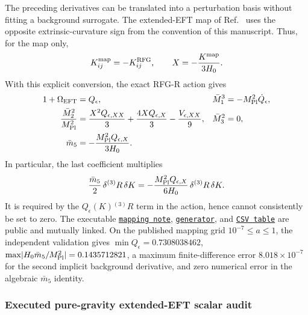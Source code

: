 \documentclass[11pt,a4paper]{article}
\newcommand{\RFGRepoURL}{https://github.com/MartinPetrasek123/MartinPetrasek123}
\newcommand{\RFGRepoNamed}[2]{\href{\RFGRepoURL/blob/main/r-universe-complete-chain/rfg-r-completion/r\_universe\_completion/#1}{\texttt{#2}}}
\begin{document}
The preceding derivatives can be translated into a perturbation basis without
fitting a background surrogate.  The extended-EFT map of
Ref.~\cite{ExtendedEFTMap} uses the opposite extrinsic-curvature sign from the
convention of this manuscript.  Thus, for the map only,
\begin{equation}
 K_{ij}^{\rm map}=-K_{ij}^{\rm RFG},\qquad
 X=-\frac{K^{\rm map}}{3H_0}.
 \label{eq:RFGR-map-convention}
\end{equation}
With this explicit conversion, the exact RFG-R action gives
\begin{align}
 1+\Omega_{\rm EFT}&=Q_\epsilon,
 &\bar M_1^3&=-M_{\rm Pl}^2\dot Q_\epsilon,\nonumber\\
 \frac{\bar M_2^2}{M_{\rm Pl}^2}
 &=\frac{X^2Q_{\epsilon,XX}}{3}
   +\frac{4XQ_{\epsilon,X}}{3}-\frac{V_{\epsilon,XX}}9,
 &\bar M_3^2&=0,\nonumber\\
 \bar m_5&=-\frac{M_{\rm Pl}^2Q_{\epsilon,X}}{3H_0}.
 \label{eq:RFGR-extended-EFT-map}
\end{align}
In particular, the last coefficient multiplies
\begin{equation}
 \frac{\bar m_5}{2}\,\delta{}^{(3)}R\,\delta K
 =-\frac{M_{\rm Pl}^2Q_{\epsilon,X}}{6H_0}
 \,\delta{}^{(3)}R\,\delta K .
 \label{eq:RFGR-m5-operator}
\end{equation}
It is required by the \(Q_\epsilon(K){}^{(3)}R\) term in the action, hence
cannot consistently be set to zero.  The executable
\RFGRepoNamed{docs/extended\_eft\_mapping.md}{mapping note},
\RFGRepoNamed{scripts/extended\_eft\_mapping.py}{generator}, and
\RFGRepoNamed{generated/tables/extended\_eft\_mapping.csv}{CSV table}
are public and mutually linked.  On the published
mapping grid \(10^{-7}\leq a\leq1\), the independent validation gives
\(\min Q_\epsilon=0.7308038462\),
\(\max\lvert H_0\bar m_5/M_{\rm Pl}^2\rvert=0.1435712821\), a maximum
finite-difference error \(8.018\times10^{-7}\) for the second implicit
background derivative, and zero numerical error in the algebraic
\(\bar m_5\) identity.

\subsubsection{Executed pure-gravity extended-EFT scalar audit}
\label{sec:rfgr-extended-scalar-audit}
\end{document}
